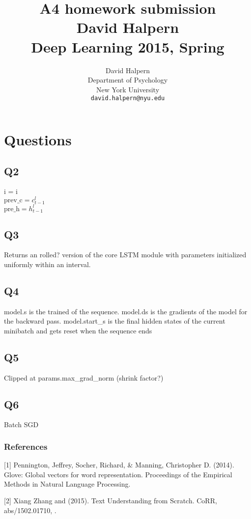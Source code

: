 \documentclass{article} %
\title{A4 homework submission \\ David Halpern \\ Deep Learning 2015, Spring}
\author{
David Halpern\\
Department of Psychology\\
New York University\\
\texttt{david.halpern@nyu.edu} \\
}
\begin{document}
\maketitle


\section{Questions}

\subsection{Q2}

i = i\\
$\text{prev\_c} = c_{t-1}^l$\\
$\text{pre\_h} = h_{t-1}^l$

\subsection{Q3}
Returns an rolled? version of the core LSTM module with parameters initialized uniformly within an interval.

\subsection{Q4}
model.s is the trained of the sequence. model.ds is the gradients of the model for the backward pass. model.start_s is the final hidden states of the current minibatch and gets reset when the sequence ends

\subsection{Q5}
Clipped at params.max_grad_norm (shrink factor?)

\subsection{Q6}
Batch SGD

\subsubsection*{References}

\small{

[1] Pennington, Jeffrey, Socher, Richard, \& Manning, Christopher D. (2014). Glove: Global vectors for word representation. Proceedings of the Empirical Methods in Natural Language Processing.

[2] Xiang Zhang and (2015). Text Understanding from Scratch. CoRR, abs/1502.01710, .
}
\end{document}
